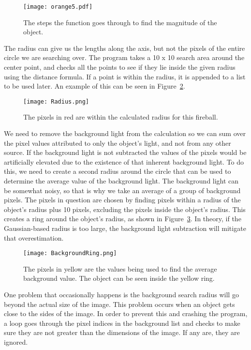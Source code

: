 \begin{figure}[htpb]
	\centering
	\texttt{[image: orange5.pdf]}
	\caption{The steps the function goes through to find the magnitude of the object.}
	\label{fig:magfinder}
\end{figure}

The radius can give us the lengths along the axis, but not the pixels of the entire circle we are searching over. The program takes a 10 x 10 search area around the center point, and checks all the points to see if they lie inside the given radius using the distance formula. If a point is within the radius, it is appended to a list to be used later. An example of this can be seen in Figure~\ref{fig:radius}.

\begin{figure}[ht!]
	\centering
	\texttt{[image: Radius.png]}
	\caption{The pixels in red are within the calculated radius for this fireball.}
	\label{fig:radius}
\end{figure}

We need to remove the background light from the calculation so we can sum over the pixel values attributed to only the object's light, and not from any other source. If the background light is not subtracted the values of the pixels would be artificially elevated due to the existence of that inherent background light. To do this, we need to create a second radius around the circle that can be used to determine the average value of the background light. The background light can be somewhat noisy, so that is why we take an average of a group of background pixels. The pixels in question are chosen by finding pixels within a radius of the object's radius plus 10 pixels, excluding the pixels inside the object's radius. This creates a ring around the object's radius, as shown in Figure~\ref{fig:background}. In theory, if the Gaussian-based radius is too large, the background light subtraction will mitigate that overestimation.

\begin{figure}[ht!]
	\centering
	\texttt{[image: BackgroundRing.png]}
	\caption{The pixels in yellow are the values being used to find the average background value. The object can be seen inside the yellow ring.}
	\label{fig:background}
\end{figure}

One problem that occasionally happens is the background search radius will go beyond the actual size of the image. This problem occurs when an object gets close to the sides of the image. In order to prevent this and crashing the program, a loop goes through the pixel indices in the background list and checks to make sure they are not greater than the dimensions of the image. If any are, they are ignored. 

